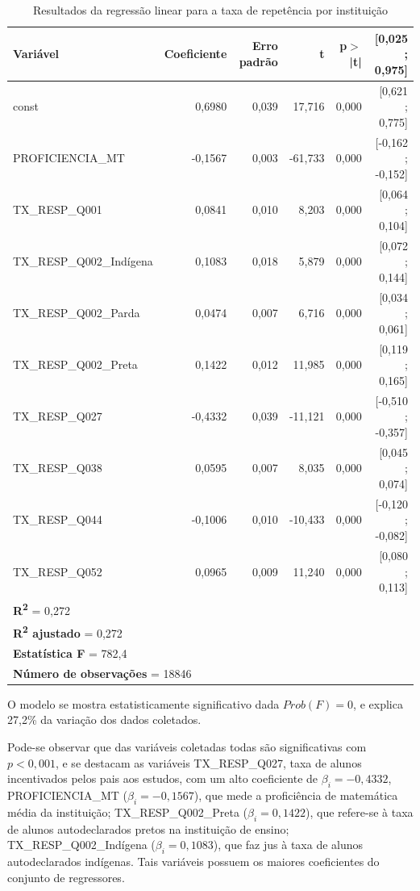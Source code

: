 \documentclass[english, spanish, brazilian]{RBIEarticle} %
\begin{document}
\begin{table}[htbp]
\centering
\caption{Resultados da regressão linear para a taxa de repetência por instituição}
\label{tab:regressao_tx_resp_q041}
\small
\begin{tabular}{lrrrrr}
\hline
\textbf{Variável} & \textbf{Coeficiente} & \textbf{Erro padrão} & \textbf{t} & \textbf{p$>$|t|} & \textbf{[0,025 ; 0,975]} \\
\hline
const & 0,6980 & 0,039 & 17,716 & 0,000 & [0,621 ; 0,775] \\
PROFICIENCIA\_MT & -0,1567 & 0,003 & -61,733 & 0,000 & [-0,162 ; -0,152] \\
TX\_RESP\_Q001 & 0,0841 & 0,010 & 8,203 & 0,000 & [0,064 ; 0,104] \\
TX\_RESP\_Q002\_Indígena & 0,1083 & 0,018 & 5,879 & 0,000 & [0,072 ; 0,144] \\
TX\_RESP\_Q002\_Parda & 0,0474 & 0,007 & 6,716 & 0,000 & [0,034 ; 0,061] \\
TX\_RESP\_Q002\_Preta & 0,1422 & 0,012 & 11,985 & 0,000 & [0,119 ; 0,165] \\
TX\_RESP\_Q027 & -0,4332 & 0,039 & -11,121 & 0,000 & [-0,510 ; -0,357] \\
TX\_RESP\_Q038 & 0,0595 & 0,007 & 8,035 & 0,000 & [0,045 ; 0,074] \\
TX\_RESP\_Q044 & -0,1006 & 0,010 & -10,433 & 0,000 & [-0,120 ; -0,082] \\
TX\_RESP\_Q052 & 0,0965 & 0,009 & 11,240 & 0,000 & [0,080 ; 0,113] \\
\hline
\multicolumn{5}{l}{\textbf{R\textsuperscript{2}} = 0,272} \\
\multicolumn{5}{l}{\textbf{R\textsuperscript{2} ajustado} = 0,272} \\
\multicolumn{5}{l}{\textbf{Estatística F} = 782,4} \\
\multicolumn{5}{l}{\textbf{Número de observações} = 18846} \\
\hline
\end{tabular}
\end{table}

O modelo se mostra estatisticamente significativo dada $Prob(F)=0$, e explica 27,2\% da variação dos dados coletados.

Pode-se observar que das variáveis coletadas todas são significativas com $p<0,001$, e se destacam as variáveis TX\_RESP\_Q027, taxa de alunos incentivados pelos pais aos estudos, com um alto coeficiente de $\beta_i=-0,4332$, PROFICIENCIA\_MT ($\beta_i=-0,1567$), que mede a proficiência de matemática média da instituição; TX\_RESP\_Q002\_Preta ($\beta_i=0,1422$), que refere-se à taxa de alunos autodeclarados pretos na instituição de ensino; TX\_RESP\_Q002\_Indígena ($\beta_i=0,1083$), que faz jus à taxa de alunos autodeclarados indígenas. Tais variáveis possuem os maiores coeficientes do conjunto de regressores. 
\end{document}
